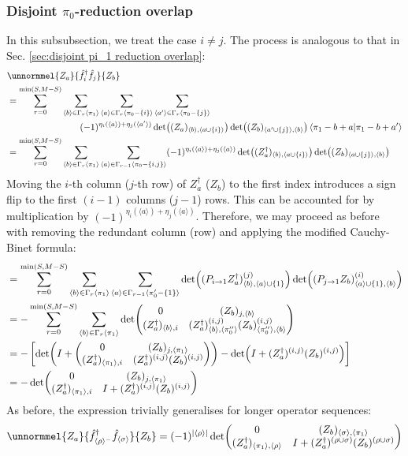 \documentclass[12pt]{article}
\newcommand{\seq}[1]{\langle #1\rangle}
\newcommand{\hc}{^\dagger}
\begin{document}
	\subsubsection{Disjoint $\pi_0$-reduction overlap} \label{sec: disjoint pi_0 reduction overlap}
	In this subsubsection, we treat the case $i\neq j$. The process is analogous to that in Sec. \ref{sec:disjoint pi_1 reduction overlap}:
	\begin{align*}
	&\unnormmel{Z_a}{\hat{f}\hc_i\hat{f}_j}{Z_b}\\
	&=\sum_{r=0}^{\min(S,M-S)}\sum_{\seq{b}\in\Gamma_r\seq{\pi_1}}\sum_{\seq{a}\in\Gamma_r\seq{\pi_0-\{i\}}}\sum_{\seq{a'}\in\Gamma_r\seq{\pi_0-\{j\}}}\\
	&\qquad\qquad\qquad\qquad(-1)^{\eta_i(\seq{a})+\eta_j(\seq{a'})}\det((Z_a)_{\seq{b}, \seq{a\cup\{i\}}})\det((Z_b)_{\seq{a'\cup\{j\}},\seq{b}})\braket{\pi_1-b+a}{\pi_1-b+a'}\\
	&=\sum_{r=0}^{\min(S,M-S)}\sum_{\seq{b}\in\Gamma_r\seq{\pi_1}}\sum_{\seq{a}\in\Gamma_{r-1}\seq{\pi_0-\{i, j\}}}(-1)^{\eta_i(\seq{a})+\eta_j(\seq{a})}\det((Z_a\hc)_{\seq{b}, \seq{a\cup \{i\}}})\det((Z_b)_{\seq{a\cup\{j\}},\seq{b}})
	\end{align*}
	Moving the $i$-th column ($j$-th row) of $Z_a\hc$ ($Z_b$) to the first index introduces a sign flip to the first $(i-1)$ columns ($j-1$) rows. This can be accounted for by multiplication by $(-1)^{\eta_i(\seq{a})+\eta_j(\seq{a})}$. Therefore, we may proceed as before with removing the redundant column (row) and applying the modified Cauchy-Binet formula:
	\begin{align*}
	&= \sum_{r=0}^{\min(S,M-S)}\sum_{\seq{b}\in\Gamma_r\seq{\pi_1}}\sum_{\seq{a}\in\Gamma_{r-1}\seq{\pi'_0-\{1\}}}\det((P_{i\to 1} Z_a\hc)^{(j)}_{\seq{b}, \seq{a}\cup \{1\}})\det((P_{j\to 1} Z_b)^{(i)}_{\seq{a}\cup\{1\},\seq{b}})\\
	&=-\sum_{r=0}^{\min(S,M-S)}\sum_{\seq{b}\in\Gamma_r\seq{\pi_1}}\det(\mqty{
		0 & (Z_b)_{j,\seq{b}}\\
		(Z_a\hc)_{\seq{b}, i} & (Z_a\hc)^{(i,j)}_{\seq{b}, \seq{\pi''_0}} (Z_b)^{(i, j)}_{\seq{\pi''_0}, \seq{b}}
	})\\
	&= -\left[\det(I+\mqty(0 & (Z_b)_{j,\seq{\pi_1}}\\
		(Z_a\hc)_{\seq{\pi_1}, i} & (Z_a\hc)^{(i,j)} ( Z_b)^{(i, j)}))-\det(I+(Z_a\hc)^{(i, j)}(Z_b)^{(i,j) })\right]\nonumber\\
	&= -\det(\mqty{
		0 & (Z_b)_{j, \seq{\pi_1}}\\
		(Z_a\hc)_{\seq{\pi_1},i} & I+(Z_a\hc)^{(i, j)}(Z_b)^{(i,j)}
	})
	\end{align*}
	As before, the expression trivially generalises for longer operator sequences:
	\begin{equation} \label{eq:disjoint pi_1 reduction overlap}
	\unnormmel{Z_a}{\hat{f}\hc_{\seq{\rho}^-}\hat{f}_{\seq{\sigma}}}{Z_b} = (-1)^{\abs{\seq{\rho}}}\det(\mqty{
		0 & (Z_b)_{\seq{\sigma}, \seq{\pi_1}}\\
		(Z_a\hc)_{\seq{\pi_1},\seq{\rho}} & I+(Z_a\hc)^{(\rho\cup\sigma)}(Z_b)^{(\rho\cup\sigma)}
	})
	\end{equation}
	
\end{document}
